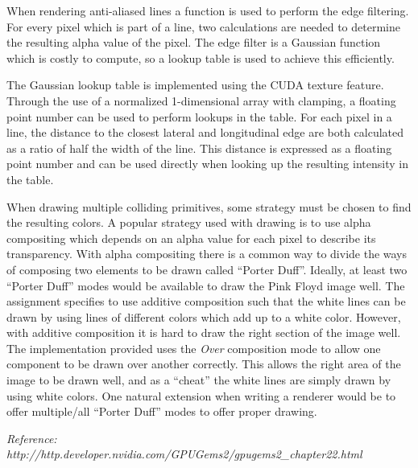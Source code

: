 When rendering anti-aliased lines a function is used to perform the edge filtering. For every pixel which is part of a line, two calculations are needed to determine the resulting alpha value of the pixel. The edge filter is a Gaussian function which is costly to compute, so a lookup table is used to achieve this efficiently.

The Gaussian lookup table is implemented using the \ac{CUDA} texture feature. Through the use of a normalized 1-dimensional array with clamping, a floating point number can be used to perform lookups in the table. For each pixel in a line, the distance to the closest lateral and longitudinal edge are both calculated as a ratio of half the width of the line. This distance is expressed as a floating point number and can be used directly when looking up the resulting intensity in the table.

When drawing multiple colliding primitives, some strategy must be chosen to find the resulting colors. A popular strategy used with drawing is to use alpha compositing which depends on an alpha value for each pixel to describe its transparency. With alpha compositing there is a common way to divide the ways of composing two elements to be drawn called ``Porter Duff''. Ideally, at least two ``Porter Duff'' modes would be available to draw the Pink Floyd image well. The assignment specifies to use additive composition such that the white lines can be drawn by using lines of different colors which add up to a white color. However, with additive composition it is hard to draw the right section of the image well. The implementation provided uses the \textit{Over} composition mode to allow one component to be drawn over another correctly. This allows the right area of the image to be drawn well, and as a ``cheat'' the white lines are simply drawn by using white colors. One natural extension when writing a renderer would be to offer multiple/all ``Porter Duff'' modes to offer proper drawing.

\textit{Reference: http://http.developer.nvidia.com/GPUGems2/gpugems2\_chapter22.html}

